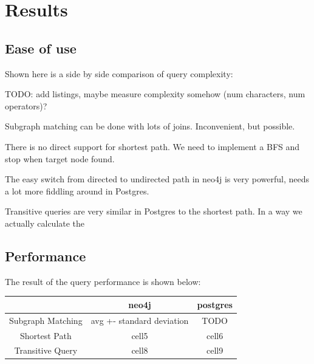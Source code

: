 \documentclass[11pt, a4paper,oneside,chapterprefix=false]{scrbook}
\begin{document}
\chapter{Results} \label{chp:results}


\section{Ease of use} \label{sec:convenience}

Shown here is a side by side comparison of query complexity:

TODO: add listings, maybe measure complexity somehow (num characters, num operators)?

Subgraph matching can be done with lots of joins.
Inconvenient, but possible.

There is no direct support for shortest path. 
We need to implement a BFS and stop when target node found.

The easy switch from directed to undirected path in neo4j is very powerful, needs a lot more fiddling around in Postgres.

Transitive queries are very similar in Postgres to the shortest path. In a way we actually calculate the 

\section{Performance} \label{sec:performance}

The result of the query performance is shown below:

\begin{center}
\begin{tabular}{ |c|c c| }
\hline
  & neo4j & postgres \\ 
  \hline
 Subgraph Matching& avg +- standard deviation & TODO \\  
 Shortest Path & cell5 & cell6 \\  
 Transitive Query & cell8 & cell9     \\
\hline
 \end{tabular}
\end{center}
\end{document}
